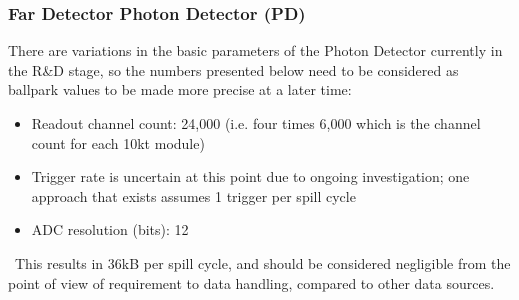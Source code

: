 

\subsubsection{Far Detector Photon Detector (PD)}
There are variations in the basic parameters of the Photon Detector currently in the R\&D stage,
so the numbers presented below need to be considered as ballpark values to be made more precise
at a later time:

\begin{itemize}
\item Readout channel count: 24,000 (i.e. four times 6,000 which is the channel count for each 10kt module)
\item Trigger rate is uncertain at this point due to ongoing investigation; one approach that exists assumes 1 trigger per spill cycle
\item ADC resolution (bits): 12
\end{itemize}
\
This results in 36kB per spill cycle, and should be considered negligible from the point of view of requirement to data handling, compared to other data sources.


